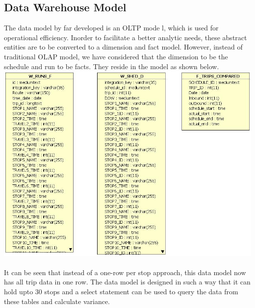 \documentclass[12pt]{article}
\begin{document}
\subsection{Data Warehouse Model}
The data model by far developed is an OLTP mode	l, which is used for operational efficiency. Inorder to facilitate a better analytic needs, these abstract entities are to be converted to a dimension and fact model. However, instead of traditional OLAP model, we have considered that the dimension to be the schedule and run to be facts. They reside in the model as shown below.\\
\includegraphics[scale=0.5]{resources/wh}\\[1cm] \\
It can be seen that instead of a one-row per stop approach, this data model now has all trip data in one row. The data model is designed in such a way that it can hold upto 30 stops and a select statement can be used to query the data from these tables and calculate variance.
\end{document}
